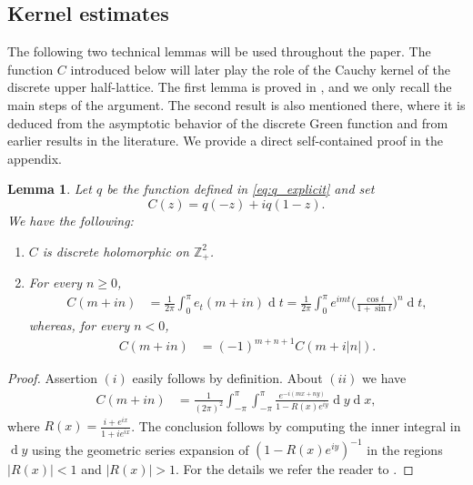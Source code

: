 \documentclass[12pt,a4paper,reqno]{amsart}
\newtheorem{lem}[thm]{Lemma}
\theoremstyle{definition}
\theoremstyle{definition}\newtheorem{defn}[thm]{Definition}
\begin{document}
    \subsection{Kernel estimates}
    The following two technical lemmas will be used throughout the paper. The function $C$ introduced below will later play the role of the Cauchy kernel of the discrete upper half-lattice.
     The first lemma is proved in \cite[Section 4]{D}, and we only recall the main steps of the argument. The second result is also mentioned there, where it is deduced from the asymptotic behavior of the discrete Green function and from earlier results in the literature. We provide a direct self-contained proof in the appendix.
        \begin{lem}\label{l:C_expansion}
            Let $q$ be the function defined in \eqref{eq:q_explicit} and set 
            \begin{equation}\label{eq:Cauchy_kernel}
            C(z)=q(-z)+iq(1-z).
            \end{equation}
        We have the following:
        \begin{enumerate}
        \item[$(i)$] $C$ is discrete holomorphic on $\mathbb Z^2_+$.
        \item[$(ii)$] For every $n\geqslant 0$,\begin{align*}
        C(m+in)&=\frac{1}{2\pi}\int_0^{\pi}e_t(m+in)\operatorname{d}\!t=\frac{1}{2\pi}\int_0^{\pi}e^{imt}\Big(\frac{\cos t}{1+\sin t}\Big)^n\operatorname{d}\!t,
        \end{align*} 
        whereas, for every $n<0$,
        \begin{align}\label{eq:kernel_negative}
        C(m+in)&=(-1)^{m+n+1}C(m+i|n|).
        \end{align}
        \end{enumerate}
        \end{lem}
    \begin{proof}
        Assertion $(i)$ easily follows by definition.  About $(ii)$ we have
        \begin{align*}
        C(m+in)&=\frac{1}{(2\pi)^2} \int_{-\pi}^{\pi}\int_{-\pi}^{\pi}  \frac{e^{-i(mx+ny)}}{1-R(x) e^{iy}}\operatorname{d}\!y\operatorname{d}\!x,
        \end{align*}
        where $R(x)=\frac{i+e^{ix}}{1+ie^{ix}}$.
        The conclusion follows by computing the inner integral in $\operatorname{d}\!y$ using the geometric series expansion of
        $(1-R(x)e^{iy})^{-1}$ in the regions
        $|R(x)|<1$ and $|R(x)|>1$. For the details we refer the reader to \cite[Section 4, equation (60)]{D}.
        \end{proof}
        
\end{document}
